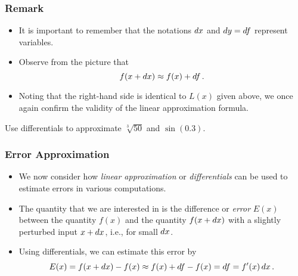 \documentclass[10pt,t,handout,ignorenonframetext,aspectratio=169]{beamer}
\begin{document}
\begin{frame}
  \frametitle{Remark}
  \begin{itemize}
  \item It is important to remember that the notations $\mathop{}\!d x$ and
    $\mathop{}\!d y = \mathop{}\!d f$ represent variables.
  \item Observe from the picture that
    \[
      f(x+\mathop{}\!d x) \approx f(x) + \mathop{}\!d f \,.
    \]
  \item Noting that the right-hand side is identical to $L(x)$ given
    above, we once again confirm the validity of the linear
    approximation formula.
  \end{itemize}
\end{frame}

\begin{frame}
  \vs{}
  \question{} Use differentials to approximate $\sqrt[3]{50}$ and $\sin(0.3)$.
\end{frame}

\begin{frame}
  \frametitle{Error Approximation}
  \begin{itemize}
  \item We now consider how \textit{linear approximation} or
    \textit{differentials} can be used to estimate errors in various
    computations.
  \item The quantity that we are interested in is the difference or
    \textit{error} $E(x)$ between the quantity $f(x)$ and the quantity
    $f(x+\mathop{}\!d x)$ with a slightly perturbed input $x+\mathop{}\!d x$, i.e., for
    small $\mathop{}\!d x$.
  \item Using differentials, we can estimate this error by
    \[
      E(x) = f(x+\mathop{}\!d x) - f(x)
      \approx f(x) + \mathop{}\!d f - f(x) = \mathop{}\!d f = f'(x) \mathop{}\!d x \,.
    \]
  \end{itemize}
\end{frame}
\end{document}
